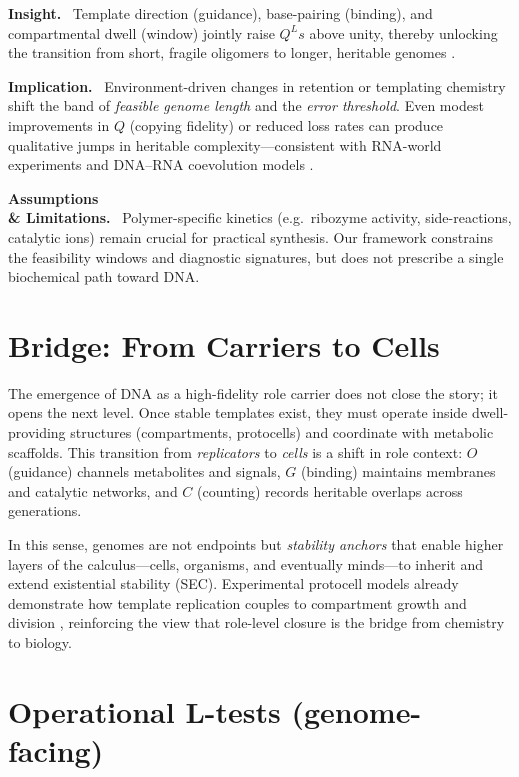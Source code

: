 \documentclass[12pt,a4paper,oneside]{scrreprt}
\newenvironment{insight}{\par\vspace{0.5em}\noindent\textbf{Insight.}\ }{\par\vspace{0.5em}}
\newenvironment{implication}{\par\vspace{0.5em}\noindent\textbf{Implication.}\ }{\par\vspace{0.5em}}
\newenvironment{limitation}{\par\vspace{0.5em}\noindent\textbf{Assumptions \\ \& Limitations.}\ }{\par\vspace{0.5em}}
\begin{document}
\begin{insight}
Template direction (guidance), base-pairing (binding), and compartmental dwell (window) jointly raise $Q^L s$ above unity, thereby unlocking the transition from short, fragile oligomers to longer, heritable genomes \cite{Eigen1971,Orgel2004,Joyce2018}.
\end{insight}

\begin{implication}
Environment-driven changes in retention or templating chemistry shift the band of \emph{feasible genome length} and the \emph{error threshold}. 
Even modest improvements in $Q$ (copying fidelity) or reduced loss rates can produce qualitative jumps in heritable complexity—consistent with RNA-world experiments and DNA–RNA coevolution models \cite{Szostak2012,Rich1962}.
\end{implication}

\begin{limitation}
Polymer-specific kinetics (e.g.\ ribozyme activity, side-reactions, catalytic ions) remain crucial for practical synthesis. 
Our framework constrains the feasibility windows and diagnostic signatures, but does not prescribe a single biochemical path toward DNA.
\end{limitation}

\section*{Bridge: From Carriers to Cells}
The emergence of DNA as a high-fidelity role carrier does not close the story; it opens the next level. 
Once stable templates exist, they must operate inside dwell-providing structures (compartments, protocells) and coordinate with metabolic scaffolds. 
This transition from \emph{replicators} to \emph{cells} is a shift in role context: $O$ (guidance) channels metabolites and signals, $G$ (binding) maintains membranes and catalytic networks, and $C$ (counting) records heritable overlaps across generations. 

In this sense, genomes are not endpoints but \emph{stability anchors} that enable higher layers of the calculus—cells, organisms, and eventually minds—to inherit and extend existential stability (SEC). 
Experimental protocell models already demonstrate how template replication couples to compartment growth and division \cite{Szostak2012,Chen2017,Luisi2006}, reinforcing the view that role-level closure is the bridge from chemistry to biology.

\section{Operational L-tests (genome-facing)}\label{sec:life-dna-tests}
\end{document}
